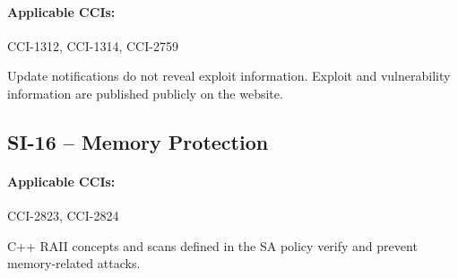 \documentclass[letterpaper, 10pt, twoside]{article}
\begin{document}
\paragraph{Applicable CCIs:} CCI-1312, CCI-1314, CCI-2759

Update notifications do not reveal exploit information. Exploit and vulnerability information are published publicly on the website.

\subsection{SI-16 -- Memory Protection}

\paragraph{Applicable CCIs:} CCI-2823, CCI-2824

C++ RAII concepts and scans defined in the SA policy verify and prevent memory-related attacks.

\clearpage
\printbibliography
\end{document}
